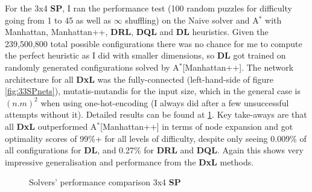 
For the 3x4 \textbf{SP}, I ran the performance test (100 random puzzles for difficulty going from 1 to 45 as well as $\infty$ shuffling) on the Naive solver and A$^{*}$ with Manhattan, Manhattan++, \textbf{DRL}, \textbf{DQL} and \textbf{DL} heuristics. Given the 239,500,800 total possible configurations there was no chance for me to compute the perfect heuristic as I did with smaller dimensions, so \textbf{DL} got trained on randomly generated configurations solved by A$^{*}$[Manhattan++]. The network architecture for all \textbf{DxL} was the fully-connected (left-hand-side of figure \ref{fig:33SPnets}), mutatis-mutandis for the input size, which in the general case is $(n.m)^{2}$ when using one-hot-encoding (I always did after a few unsuccessful attempts without it). Detailed results can be found at \ref{fig:34SPPerformance}. Key take-aways are that all \textbf{DxL} outperformed A$^{*}$[Manhattan++] in terms of node expansion and got optimality scores of 99\%+ for all levels of difficulty, despite only seeing 0.009\% of all configurations for \textbf{DL}, and 0.27\% for \textbf{DRL} and \textbf{DQL}. Again this shows very impressive generalisation and performance from the \textbf{DxL} methods.

\label{ssec:34SPSC}

\begin{figure}[H]
  \noindent
  \caption[34SPPerformance]{Solvers' performance comparison 3x4 \textbf{SP}}
   \label{fig:34SPPerformance}
\end{figure}





